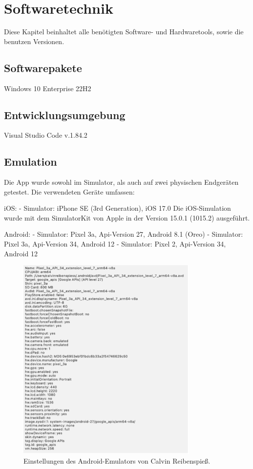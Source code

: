 
\chapter{Softwaretechnik}
Diese Kapitel beinhaltet alle benötigten Software- und Hardwaretools, sowie die benutzen Versionen.
\section{Softwarepakete}
Windows 10 Enterprise 22H2

\section{Entwicklungsumgebung}
Visual Studio Code v.1.84.2

\section{Emulation}

Die App wurde sowohl im Simulator, als auch auf zwei physischen Endgeräten getestet.
Die verwendeten Geräte umfassen:

iOS:
-	Simulator: iPhone SE (3rd Generation), iOS 17.0
Die iOS-Simulation wurde mit dem SimulatorKit von Apple in der Version 15.0.1 (1015.2) ausgeführt.

Android:
-	Simulator: Pixel 3a, Api-Version 27, Android 8.1 (Oreo)
-	Simulator: Pixel 3a, Api-Version 34, Android 12
-	Simulator: Pixel 2, Api-Version 34, Android 12

\begin{figure}[H]
    \centering
    \includegraphics[width=0.8\textwidth]{images/android_emulator_reibenspiess.png}
    \caption{Einstellungen des Android-Emulators von Calvin Reibenspieß.}
    \label{branding}
\end{figure}

